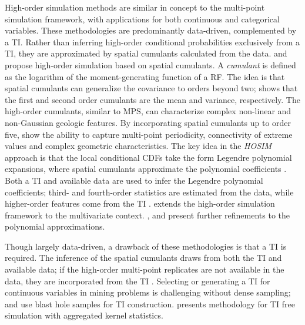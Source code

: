 High-order simulation methods are similar in concept to the multi-point simulation framework, with applications for both continuous and categorical variables. These methodologies are predominantly data-driven, complemented by a \gls{TI}. Rather than inferring high-order conditional probabilities exclusively from a \gls{TI}, they are approximated by spatial cumulants calculated from the data. \cite{dimitrakopoulos2009highorder} and \cite{mustapha2010highorder,mustapha2011hosim} propose high-order simulation based on spatial cumulants. A \textit{cumulant} is defined as the logarithm of the moment-generating function of a \gls{RF}. The idea is that spatial cumulants can generalize the covariance to orders beyond two; \cite{dimitrakopoulos2009highorder} shows that the first and second order cumulants are the mean and variance, respectively. The high-order cumulants, similar to \gls{MPS}, can characterize complex non-linear and non-Gaussian geologic features. By incorporating spatial cumulants up to order five, \cite{mustapha2010highorder} show the ability to capture multi-point periodicity, connectivity of extreme values and complex geometric characteristics. The key idea in the \textit{HOSIM} approach \citep{mustapha2011hosim} is that the local conditional \glspl{CDF} take the form Legendre polynomial expansions, where spatial cumulants approximate the polynomial coefficients \citep{mustapha2010highorder}. Both a \gls{TI} and available data are used to infer the Legendre polynomial coefficients; third- and fourth-order statistics are estimated from the data, while higher-order features come from the \gls{TI} \citep{minniakhmetov2022highorder}. \cite{minniakhmetov2017joint} extends the high-order simulation framework to the multivariate context. \cite{minniakhmetov2018highorder}, \cite{yao2020highorder} and \cite{yao2021learning} present further refinements to the polynomial approximations.

Though largely data-driven, a drawback of these methodologies is that a \gls{TI} is required. The inference of the spatial cumulants draws from both the \gls{TI} and available data; if the high-order multi-point replicates are not available in the data, they are incorporated from the \gls{TI} \citep{mustapha2010highorder,yao2021training}. Selecting or generating a \gls{TI} for continuous variables in mining problems is challenging without dense sampling; \cite{minniakhmetov2018highorder} and \cite{decarvalho2019highorder} use blast hole samples for \gls{TI} construction. \cite{yao2021training} presents methodology for \gls{TI} free simulation with aggregated kernel statistics.

